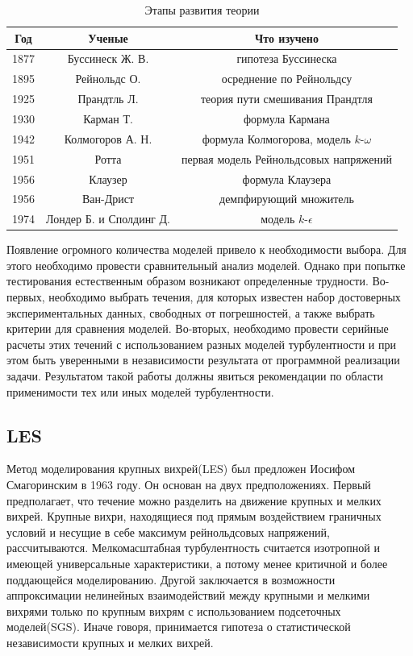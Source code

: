 	\begin{table}[H]
		\begin{center}
			\begin{tabular}{|c|c|c|}
				\hline
				Год & Ученые & Что изучено\\
				\hline
				1877 & Буссинеск Ж. В. & гипотеза Буссинеска\\
				\hline
				1895 & Рейнольдс О. & осреднение по Рейнольдсу\\
				\hline
				1925 & Прандтль Л. & теория пути смешивания Прандтля\\
				\hline
				1930 & Карман Т. & формула Кармана\\
				\hline
				1942 & Колмогоров А. Н. & формула Колмогорова, модель $k$-$\omega$\\
				\hline
				1951 & Ротта & первая модель Рейнольдсовых напряжений\\
				\hline
				1956 & Клаузер & формула Клаузера\\
				\hline
				1956 & Ван-Дрист & демпфирующий множитель\\
				\hline
				1974 & Лондер Б. и Сполдинг Д. & модель $k$-$\epsilon$\\
				\hline
			\end{tabular}
		\end{center}
		\caption{Этапы развития теории}
	\end{table}
	
	Появление огромного количества моделей привело к необходимости выбора. Для этого необходимо провести сравнительный анализ моделей. Однако при попытке тестирования естественным образом возникают определенные трудности. Во-первых, необходимо выбрать течения, для которых известен набор достоверных экспериментальных данных, свободных от погрешностей, а также выбрать критерии для сравнения моделей. Во-вторых, необходимо провести серийные расчеты этих течений с использованием разных моделей турбулентности и при этом быть уверенными в независимости результата от программной реализации задачи. Результатом такой работы должны явиться рекомендации по области применимости тех или иных моделей турбулентности.

\subsection{LES}
	
	Метод моделирования крупных вихрей(LES) был предложен Иосифом Смагоринским в 1963 году. Он основан на двух предположениях. Первый предполагает, что течение можно разделить на движение крупных и мелких вихрей. Крупные вихри, находящиеся под прямым воздействием граничных условий и несущие в себе максимум рейнольдсовых напряжений, рассчитываются. Мелкомасштабная турбулентность считается изотропной и имеющей универсальные характеристики, а потому менее критичной и более поддающейся моделированию. Другой  заключается в возможности аппроксимации нелинейных взаимодействий между крупными и мелкими вихрями только по крупным вихрям с использованием подсеточных моделей(SGS). Иначе говоря, принимается гипотеза о статистической независимости крупных и мелких вихрей.
	
